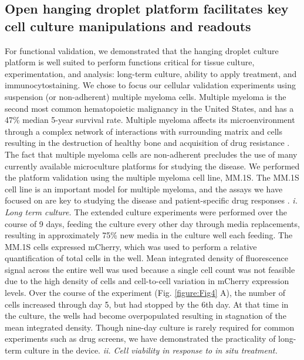 \subsection{Open hanging droplet platform facilitates key cell culture manipulations and readouts}
For functional validation, we demonstrated that the hanging droplet culture platform is well suited to perform functions critical for tissue culture, experimentation, and analysis: long-term culture, ability to apply treatment, and immunocytostaining. We chose to focus our cellular validation experiments using suspension (or non-adherent) multiple myeloma cells. Multiple myeloma is the second most common hematopoietic malignancy in the United States, and has a 47\% median 5-year survival rate. Multiple myeloma affects its microenvironment through a complex network of interactions with surrounding matrix and cells resulting in the destruction of healthy bone \cite{Reagan2014} and acquisition of drug resistance \cite{Bianchi2006}. The fact that multiple myeloma cells are non-adherent precludes the use of many currently available microculture platforms for studying the disease.  We performed the platform validation using the multiple myeloma cell line, MM.1S. The MM.1S cell line is an important model for multiple myeloma, and the assays we have focused on are key to studying the disease and patient-specific drug responses \cite{Young2012}.
\newline
\textit{i. Long term culture.} The extended culture experiments were performed over the course of 9 days, feeding the culture every other day through media replacements, resulting in approximately 75\% new media in the culture well each feeding. The MM.1S cells expressed mCherry, which was used to perform a relative quantification of total cells in the well. Mean integrated density of fluorescence signal across the entire well was used because a single cell count was not feasible due to the high density of cells and cell-to-cell variation in mCherry expression levels. Over the course of the experiment (Fig. \ref{figure:Fig4} A), the number of cells increased through day 5, but had stopped by the 6th day. At that time in the culture, the wells had become overpopulated resulting in stagnation of the mean integrated density. Though nine-day culture is rarely required for common experiments such as drug screens, we have demonstrated the practicality of long-term culture in the device. \newline
\textit{ii. Cell viability in response to \textit{in situ} treatment.}

